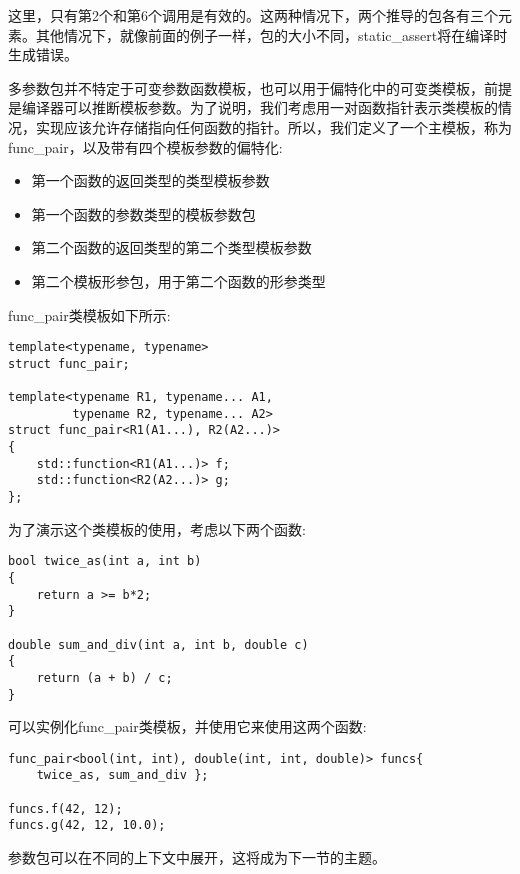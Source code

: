 这里，只有第2个和第6个调用是有效的。这两种情况下，两个推导的包各有三个元素。其他情况下，就像前面的例子一样，包的大小不同，static\_assert将在编译时生成错误。

多参数包并不特定于可变参数函数模板，也可以用于偏特化中的可变类模板，前提是编译器可以推断模板参数。为了说明，我们考虑用一对函数指针表示类模板的情况，实现应该允许存储指向任何函数的指针。所以，我们定义了一个主模板，称为func\_pair，以及带有四个模板参数的偏特化:

\begin{itemize}
\item
第一个函数的返回类型的类型模板参数

\item
第一个函数的参数类型的模板参数包

\item
第二个函数的返回类型的第二个类型模板参数

\item
第二个模板形参包，用于第二个函数的形参类型
\end{itemize}

func\_pair类模板如下所示:

\begin{lstlisting}[style=styleCXX]
template<typename, typename>
struct func_pair;

template<typename R1, typename... A1,
         typename R2, typename... A2>
struct func_pair<R1(A1...), R2(A2...)>
{
	std::function<R1(A1...)> f;
	std::function<R2(A2...)> g;
};
\end{lstlisting}

为了演示这个类模板的使用，考虑以下两个函数:

\begin{lstlisting}[style=styleCXX]
bool twice_as(int a, int b)
{
	return a >= b*2;
}

double sum_and_div(int a, int b, double c)
{
	return (a + b) / c;
}
\end{lstlisting}

可以实例化func\_pair类模板，并使用它来使用这两个函数:

\begin{lstlisting}[style=styleCXX]
func_pair<bool(int, int), double(int, int, double)> funcs{
	twice_as, sum_and_div };

funcs.f(42, 12);
funcs.g(42, 12, 10.0);
\end{lstlisting}

参数包可以在不同的上下文中展开，这将成为下一节的主题。


